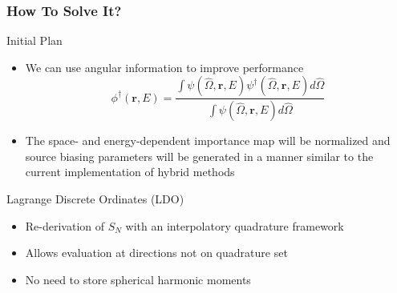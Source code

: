 \documentclass[xcolor=x11names,compress]{beamer}
\renewcommand{\(}{\begin{columns}}
\renewcommand{\)}{\end{columns}}
\newcommand{\<}[1]{\begin{column}{#1}}
\renewcommand{\>}{\end{column}}
\newcommand{\vOmega}{\ensuremath{\hat{\Omega}}}
\newcommand{\ve}[1]{\ensuremath{\mathbf{#1}}}
\begin{document}
\begin{frame}[fragile]
  \frametitle{How To Solve It?}

Initial Plan
	\begin{itemize}
	\item We can use angular information to improve performance
		\begin{equation}
		\phi^{\dagger}(\ve{r},E) = \frac{\int \psi(\vOmega, \ve{r},E) \psi^{\dagger}(\vOmega, \ve{r},E) d\vOmega}{\int \psi(\vOmega, \ve{r},E)  d\vOmega} \nonumber
		\end{equation}

	\item The space- and energy-dependent importance map will be normalized and source biasing parameters will be generated in a manner similar to the current implementation of hybrid methods
	\end{itemize}

Lagrange Discrete Ordinates (LDO)	
	\begin{itemize}
	\item Re-derivation of $S_N$ with an interpolatory quadrature framework
	\item Allows evaluation at directions not on quadrature set
	\item No need to store spherical harmonic moments
	\end{itemize}	

\end{frame}
\end{document}
